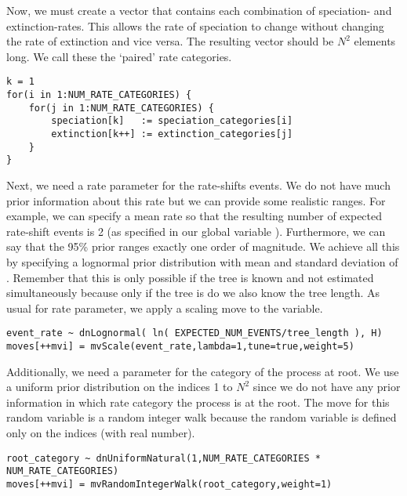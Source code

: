 Now, we must create a vector that contains each combination of speciation- and extinction-rates.
This allows the rate of speciation to change without changing the rate of extinction and vice versa.
The resulting vector should be $N^2$ elements long.
We call these the `paired' rate categories.

{\tt \begin{snugshade*}
\begin{lstlisting}
k = 1
for(i in 1:NUM_RATE_CATEGORIES) {
    for(j in 1:NUM_RATE_CATEGORIES) {
        speciation[k]   := speciation_categories[i]
        extinction[k++] := extinction_categories[j]
    }
}
\end{lstlisting}
\end{snugshade*}}


Next, we need a rate parameter for the rate-shifts events.
We do not have much prior information about this rate but we can provide some realistic ranges.
For example, we can specify a mean rate so that the resulting number of expected rate-shift events is 2 (as specified in our global variable ).
Furthermore, we can say that the 95\% prior ranges exactly one order of magnitude.
We achieve all this by specifying a lognormal prior distribution with mean  and standard deviation of .
Remember that this is only possible if the tree is known and not estimated simultaneously because only if the tree is do we also know the tree length.
As usual for rate parameter, we apply a scaling move to the  variable.
{\tt \begin{snugshade*}
\begin{lstlisting}
event_rate ~ dnLognormal( ln( EXPECTED_NUM_EVENTS/tree_length ), H)
moves[++mvi] = mvScale(event_rate,lambda=1,tune=true,weight=5)
\end{lstlisting}
\end{snugshade*}}

Additionally, we need a parameter for the category of the process at root.
We use a uniform prior distribution on the indices 1 to $N^2$ since we do not have any prior information in which rate category the process is at the root.
The move for this random variable is a random integer walk because the random variable is defined only on the indices (\IE with real number).
{\tt \begin{snugshade*}
\begin{lstlisting}
root_category ~ dnUniformNatural(1,NUM_RATE_CATEGORIES * NUM_RATE_CATEGORIES)
moves[++mvi] = mvRandomIntegerWalk(root_category,weight=1)
\end{lstlisting}
\end{snugshade*}}



